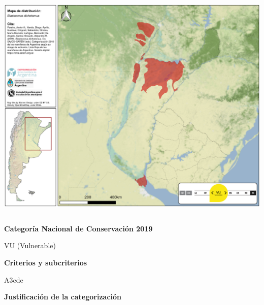 \documentclass[
  x11names]{article}
\begin{document}
\includegraphics[width=1\linewidth]{maps/Cetartiodactyla/Blastocerus_dichotomus}

%
\begin{table}[H]
\centering
\begin{tabular}[t]{>{\raggedright\arraybackslash}m{16cm}>{}m{16cm}}
\toprule
\cellcolor{ceil}{\textcolor{white}{\textbf{\rule{0pt}{14pt}CATEGORÍAS DE CONSERVACIÓN}}}\\
\bottomrule
\end{tabular}
\end{table}

\vspace{-0.4cm}

\textbf{Categoría Nacional de Conservación 2019}

VU (Vulnerable)

\textbf{Criterios y subcriterios}

A3cde

\textbf{Justificación de la categorización}
\end{document}
